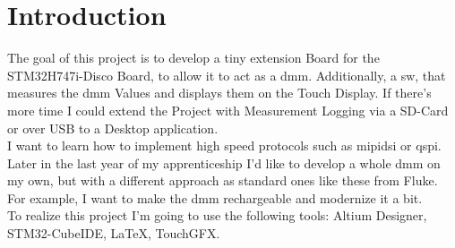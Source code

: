 \chapter{Introduction}
\label{cha:Introduction}


The goal of this project is to develop a tiny extension Board for the STM32H747i-Disco Board, to allow it to act as a \acs{dmm}. Additionally, a \acs{sw}, that measures the \acs{dmm} Values and displays them on the Touch Display. If there's more time I could extend the Project with Measurement Logging via a SD-Card or over USB to a Desktop application.
\\
I want to learn how to implement high speed protocols such as \acs{mipidsi} or \acs{qspi}. Later in the last year of my apprenticeship I'd like to develop a whole \acs{dmm} on my own, but with a different approach as standard ones like these from Fluke. For example, I want to make the \acs{dmm} rechargeable and modernize it a bit. 
\\
To realize this project I'm going to use the following tools: Altium Designer, STM32-CubeIDE, LaTeX, TouchGFX.
